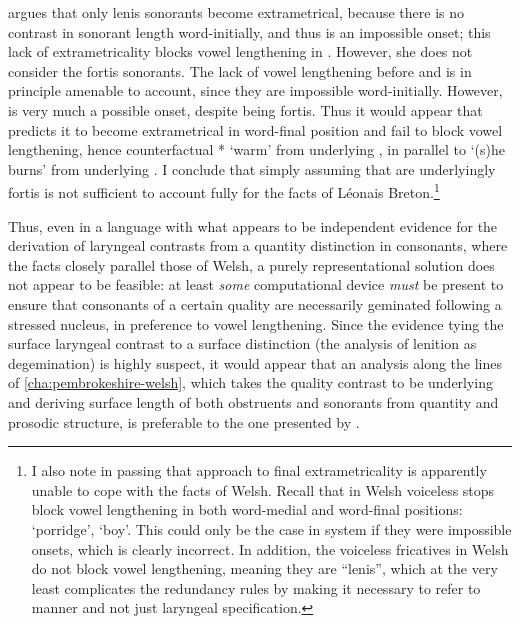 \citet{carlyle88:_breton} argues that only lenis sonorants become extrametrical, because there is no contrast in sonorant length word\hyp initially, and thus \ipa{[nː]} is an impossible onset; this lack of extrametricality blocks vowel lengthening in \ipa{[ˈjenː]}. However, she does not consider the fortis sonorants. The lack of vowel lengthening before \ipa{[ɲ]} and \ipa{[ʎ]} is in principle amenable to  account, since they are impossible word\hyp initially. However, \ipa{[m]} is very much a possible onset, despite being fortis. Thus it would appear that \citet{carlyle88:_breton} predicts it to become extrametrical in word\hyp final position and fail to block vowel lengthening, hence counterfactual *\ipa{[toːm]} `warm' from underlying , in parallel to \ipa{[ˈskoːt]} `(s)he burns' from underlying . I conclude that simply assuming that \ipa{[m~ɲ~ʎ]} are underlyingly fortis is not sufficient to account fully for the facts of Léonais Breton.\footnote{I also note in passing that  approach to final extrametricality is apparently unable to cope with the facts of Welsh. Recall that in Welsh voiceless stops block vowel lengthening in both word\hyp medial and word\hyp final positions: \ipa{[ˈsopas]} `porridge', \ipa{[ˈkrut]} `boy'. This could only be the case in  system if they were impossible onsets, which is clearly incorrect. In addition, the voiceless fricatives \ipa{[f~θ~χ]} in Welsh do not block vowel lengthening, meaning they are \enquote{lenis}, which at the very least complicates the redundancy rules by making it necessary to refer to manner and not just laryngeal specification.}

Thus, even in a language with what appears to be independent evidence for the derivation of laryngeal contrasts from a quantity distinction in consonants, where the facts closely parallel those of Welsh, a purely representational solution does not appear to be feasible: at least \emph{some} computational device \emph{must} be present to ensure that consonants of a certain quality are necessarily geminated following a stressed nucleus, in preference to vowel lengthening. Since the evidence tying the surface laryngeal contrast to a surface distinction (\ie the analysis of lenition as degemination) is highly suspect, it would appear that an analysis along the lines of \cref{cha:pembrokeshire-welsh}, which takes the quality contrast to be underlying and deriving surface length of both obstruents and sonorants from quantity and prosodic structure, is preferable to the one presented by \citet{carlyle88:_breton}.

